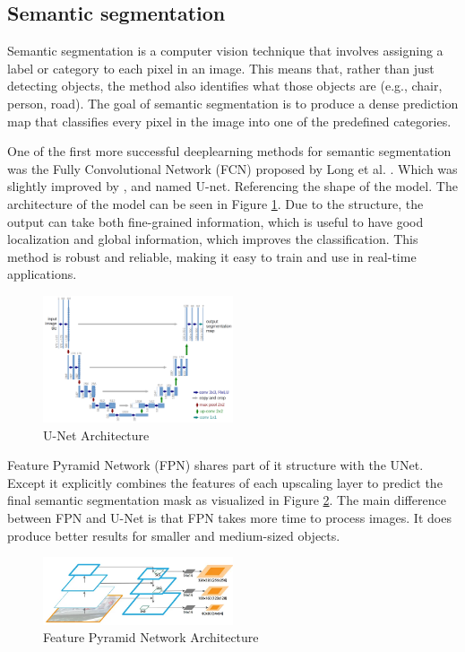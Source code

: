 \subsection{Semantic segmentation}
Semantic segmentation is a computer vision technique that involves assigning a label or category to each pixel in an image. This means that, rather than just detecting objects, the method also identifies what those objects are (e.g., chair, person, road). The goal of semantic segmentation is to produce a dense prediction map that classifies every pixel in the image into one of the predefined categories.

One of the first more successful deeplearning methods for semantic segmentation was the Fully Convolutional Network (FCN) proposed by Long et al. \cite{long2015fully}. Which was slightly improved by \cite{ronneberger2015u}, and named U-net. Referencing the shape of the model. The architecture of the model can be seen in Figure \ref{fig:unet-architecture}. Due to the structure, the output can take both fine-grained information, which is useful to have good localization and global information, which improves the classification. This method is robust and reliable, making it easy to train and use in real-time applications.
\begin{figure}[ht]
    \centering
    \includegraphics[width=0.5\textwidth]{figures/unet-architecture.png}
    \caption{U-Net Architecture \cite{ronneberger2015u}}
    \label{fig:unet-architecture}
\end{figure}

Feature Pyramid Network (FPN) \cite{lin2017feature} shares part of it structure with the UNet. Except it explicitly combines the features of each upscaling layer to predict the final semantic segmentation mask as visualized in Figure \ref{fig:fpn-architecture}. The main difference between FPN and U-Net is that FPN takes more time to process images. It does produce better results for smaller and medium-sized objects.

\begin{figure}[ht]
    \centering
    \includegraphics[width=0.5\textwidth]{figures/fpn-architecture.png}
    \caption{Feature Pyramid Network Architecture \cite{lin2017feature}}
    \label{fig:fpn-architecture}
\end{figure}

